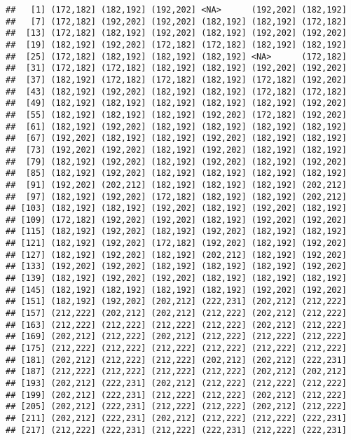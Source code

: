 \documentclass[
]{article}
\begin{document}
\begin{verbatim}
##   [1] (172,182] (182,192] (192,202] <NA>      (192,202] (182,192]
##   [7] (172,182] (192,202] (192,202] (182,192] (182,192] (172,182]
##  [13] (172,182] (182,192] (192,202] (182,192] (192,202] (192,202]
##  [19] (182,192] (192,202] (172,182] (172,182] (182,192] (182,192]
##  [25] (172,182] (182,192] (182,192] (182,192] <NA>      (172,182]
##  [31] (172,182] (172,182] (182,192] (182,192] (192,202] (192,202]
##  [37] (182,192] (172,182] (172,182] (182,192] (172,182] (192,202]
##  [43] (182,192] (192,202] (182,192] (182,192] (172,182] (172,182]
##  [49] (182,192] (182,192] (182,192] (182,192] (182,192] (192,202]
##  [55] (182,192] (182,192] (182,192] (192,202] (172,182] (192,202]
##  [61] (182,192] (192,202] (182,192] (182,192] (182,192] (182,192]
##  [67] (192,202] (182,192] (182,192] (192,202] (182,192] (182,192]
##  [73] (192,202] (192,202] (182,192] (192,202] (182,192] (182,192]
##  [79] (182,192] (192,202] (182,192] (192,202] (182,192] (192,202]
##  [85] (182,192] (192,202] (182,192] (182,192] (182,192] (182,192]
##  [91] (192,202] (202,212] (182,192] (182,192] (182,192] (202,212]
##  [97] (182,192] (192,202] (172,182] (182,192] (182,192] (202,212]
## [103] (182,192] (182,192] (192,202] (182,192] (192,202] (182,192]
## [109] (172,182] (192,202] (192,202] (182,192] (192,202] (192,202]
## [115] (182,192] (192,202] (182,192] (192,202] (182,192] (182,192]
## [121] (182,192] (192,202] (172,182] (192,202] (182,192] (192,202]
## [127] (182,192] (192,202] (182,192] (202,212] (182,192] (192,202]
## [133] (192,202] (192,202] (182,192] (182,192] (182,192] (192,202]
## [139] (182,192] (192,202] (192,202] (182,192] (182,192] (182,192]
## [145] (182,192] (182,192] (182,192] (182,192] (192,202] (192,202]
## [151] (182,192] (192,202] (202,212] (222,231] (202,212] (212,222]
## [157] (212,222] (202,212] (202,212] (212,222] (202,212] (212,222]
## [163] (212,222] (212,222] (212,222] (212,222] (202,212] (212,222]
## [169] (202,212] (212,222] (202,212] (212,222] (212,222] (212,222]
## [175] (212,222] (212,222] (212,222] (212,222] (212,222] (212,222]
## [181] (202,212] (212,222] (212,222] (202,212] (202,212] (222,231]
## [187] (212,222] (212,222] (212,222] (212,222] (202,212] (202,212]
## [193] (202,212] (222,231] (202,212] (212,222] (212,222] (212,222]
## [199] (202,212] (222,231] (212,222] (212,222] (202,212] (212,222]
## [205] (202,212] (222,231] (212,222] (212,222] (202,212] (212,222]
## [211] (202,212] (222,231] (202,212] (212,222] (212,222] (222,231]
## [217] (212,222] (222,231] (212,222] (222,231] (212,222] (222,231]

\end{verbatim}
\end{document}
